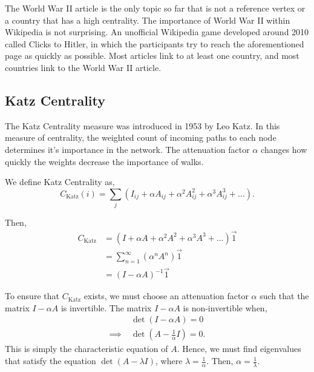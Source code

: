 \documentclass{article}
\begin{document}
The World War II article is the only topic so far that is not a reference vertex or a country that has a high centrality. The importance of World War II within Wikipedia is not surprising. An unofficial Wikipedia game developed around 2010 called Clicks to Hitler, in which the participants try to reach the aforementioned page as quickly as possible.
\autocite{cornell}
Most articles link to at least one country, and most countries link to the World War II article.

\subsection{Katz Centrality}

The Katz Centrality measure was introduced in 1953 by Leo Katz.
\autocite{katz1953}
In this measure of centrality, the weighted count of incoming paths to each node determines it's importance in the network. The attenuation factor $\alpha$ changes how quickly the weights decrease the importance of walks.

We define Katz Centrality as,
\begin{equation*}
    C_{\textrm{Katz}}(i) = \sum_{j} (I_{ij} + \alpha A_{ij} + \alpha^2 A_{ij}^2 + \alpha^3 A_{ij}^3 + \dots).
\end{equation*}
\autocite{katz2011}

Then,
\begin{align*}
    C_{\textrm{Katz}} &= (I + \alpha A + \alpha^2 A^2 + \alpha^3 A^3 + \dots) \overrightarrow{1}\\
    &= \sum^\infty_{n=1} (\alpha^n A^n)\overrightarrow{1} \\ 
&= (I - \alpha A)^{-1} \overrightarrow{1} 
\end{align*}

To ensure that $C_{\textrm{Katz}}$ exists, we must choose an attenuation factor $\alpha$ such that the matrix $I - \alpha A$ is invertible. The matrix $I - \alpha A$ is non-invertible when,
\begin{align*}
    & \det (I - \alpha A) = 0 \\
    \implies \; & \det (A - \frac{1}{\alpha} I) = 0.
\end{align*}
This is simply the characteristic equation of $A$. Hence, we must find eigenvalues that satisfy the equation $\det(A - \lambda I)$, where $\lambda = \frac{1}{\alpha}$. Then, $\alpha = \frac{1}{\lambda}$.
\end{document}

